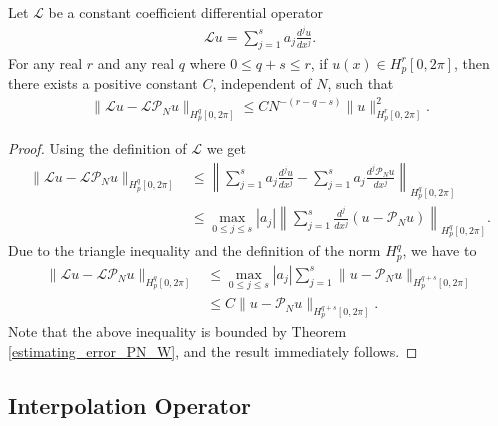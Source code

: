    \begin{teor}
   	\label{estimating_error_operator_PN_W}
    Let $\mathcal{L}$ be a constant coefficient differential operator
    	\begin{align*}
    	    \mathcal{L} u = \displaystyle \sum_{j=1}^{s} a_j \frac{d^j u}{d x^j}.  
    	\end{align*}
    For any real $r$ and any real $q$ where $0 \leq q + s \leq r$, if $u(x) \in H_p^r [0, 2\pi]$, then there exists a positive constant $C$, independent of $N$, such that
    	\begin{align*}
    	     \| \mathcal{L} u - \mathcal{L} \mathcal{P}_{N} u \|_{H^q_p [0, 2\pi]} \leq C N^{-(r - q - s)} \| u \|^2_{H^r_p [0, 2\pi]}. 
    	\end{align*}
   \end{teor}    	
   \begin{proof}
   Using the definition of $\mathcal{L}$ we get
    	\begin{align*}
    	     \| \mathcal{L} u - \mathcal{L} \mathcal{P}_{N} u \|_{H^q_p [0, 2\pi]} &\leq \displaystyle \left \|  \sum_{j=1}^{s} a_j \frac{d^j u}{d x^j} - \sum_{j=1}^{s} a_j \frac{d^j \mathcal{P}_{N} u}{d x^j}   \right \|_{H^q_p [0, 2\pi]} \\
    	     &\leq \max_{0 \leq j \leq s} |a_j| \left \|  \sum_{j=1}^{s} \frac{d^j}{d x^j} (u - \mathcal{P}_{N} u)  \right \|_{H^q_p [0, 2\pi]}.
    	     \end{align*}
   	Due to the triangle inequality and the definition of the norm $H^q_p$, we have to
   		\begin{align*}
    	     \| \mathcal{L} u - \mathcal{L} \mathcal{P}_{N} u \|_{H^q_p [0, 2\pi]} &\leq \max_{0 \leq j \leq s} |a_j| \sum_{j=1}^{s}  \| u - \mathcal{P}_{N} u \|_{H^{q+s}_p [0, 2\pi]} \\
    	     &\leq C \| u - \mathcal{P}_{N} u \|_{H^{q+s}_p [0, 2\pi]}.
    	\end{align*}
    Note that the above inequality is bounded by Theorem \ref{estimating_error_PN_W}, and the result immediately follows.    
	\end{proof}

    \subsection{Interpolation Operator}
    
